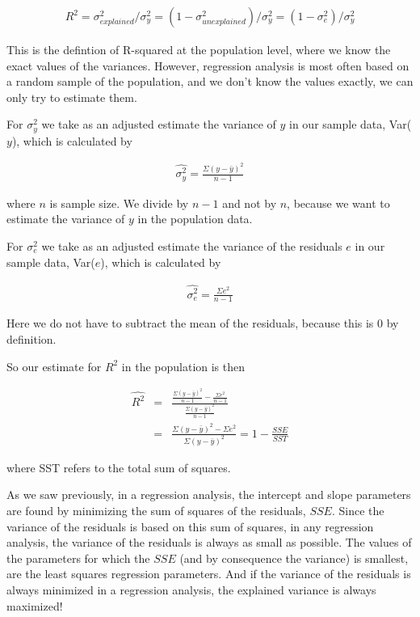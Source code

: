 \documentclass[]{book}\usepackage[]{graphicx}\usepackage[]{color}
\begin{document}
\begin{eqnarray}
R^2 = \sigma^2_{explained}/ \sigma^2_y = (1-\sigma^2_{unexplained})/\sigma^2_y = (1-\sigma^2_e)/\sigma^2_y
\end{eqnarray}

This is the defintion of R-squared at the population level, where we know the exact values of the variances. However, regression analysis is most often based on a random sample of the population, and we don't know the values exactly, we can only try to estimate them.

For $\sigma_y^2$ we take as an adjusted estimate the variance of $y$ in our sample data, Var($y$), which is calculated by


\begin{eqnarray}
\widehat{\sigma_y^2} =  \frac{  \Sigma (y-\bar{y})^2  }{n-1}
\end{eqnarray}

where $n$ is sample size. We divide by $n-1$ and not by $n$, because we want to estimate the variance of $y$ in the population data.

For $\sigma_e^2$ we take as an adjusted estimate the variance of the residuals $e$ in our sample data, Var($e$), which is calculated by


\begin{eqnarray}
\widehat{\sigma_e^2} =  \frac{  \Sigma e^2  }{n-1}
\end{eqnarray}

Here we do not have to subtract the mean of the residuals, because this is 0 by definition.

So our estimate for $R^2$ in the population is then


\begin{eqnarray}
\widehat{R^2} &=&  \frac   { \frac{  \Sigma (y-\bar{y})^2  }{n-1}- \frac{  \Sigma e^2  }{n-1}}{\frac{  \Sigma (y-\bar{y})^2  }{n-1}} \nonumber\\
&=& \frac{ \Sigma (y-\bar{y})^2 - \Sigma e^2}{\Sigma (y-\bar{y})^2} = 1 - \frac{SSE}{SST}
\end{eqnarray}

where SST refers to the total sum of squares.

As we saw previously, in a regression analysis, the intercept and slope parameters are found by minimizing the sum of squares of the residuals, $SSE$. Since the variance of the residuals is based on this sum of squares, in any regression analysis, the variance of the residuals is always as small as possible. The values of the parameters for which the $SSE$ (and by consequence the variance) is smallest, are the least squares regression parameters. And if the variance of the residuals is always minimized in a regression analysis, the explained variance is always maximized!
\end{document}
